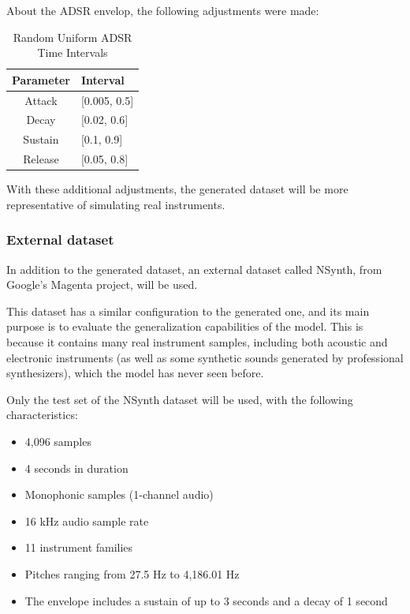\documentclass[sigconf,natbib=false]{acmart}
\begin{document}
About the ADSR envelop, the following adjustments were made:

\begin{table}
  \caption{Random Uniform ADSR Time Intervals}
  \label{tab:time_intervals}
  \begin{tabular}{cl}
    \toprule
    Parameter & Interval \\
    \midrule
    Attack  & [0.005, 0.5] \\
    Decay   & [0.02, 0.6] \\
    Sustain & [0.1, 0.9] \\
    Release & [0.05, 0.8] \\
    \bottomrule
  \end{tabular}
\end{table}

With these additional adjustments, the generated dataset will be more representative of simulating real instruments.

\subsubsection{External dataset}

In addition to the generated dataset, an external dataset called NSynth, from Google's Magenta project, will be used.

This dataset has a similar configuration to the generated one, and its main purpose is to evaluate the generalization capabilities of the model. This is because it contains many real instrument samples, including both acoustic and electronic instruments (as well as some synthetic sounds generated by professional synthesizers), which the model has never seen before.

Only the test set of the NSynth dataset will be used, with the following characteristics:

\begin{itemize}
\item 4,096 samples
\item 4 seconds in duration
\item Monophonic samples (1-channel audio)
\item 16 kHz audio sample rate
\item 11 instrument families
\item Pitches ranging from 27.5 Hz to 4,186.01 Hz
\item The envelope includes a sustain of up to 3 seconds and a decay of 1 second
\end{itemize}
\end{document}
